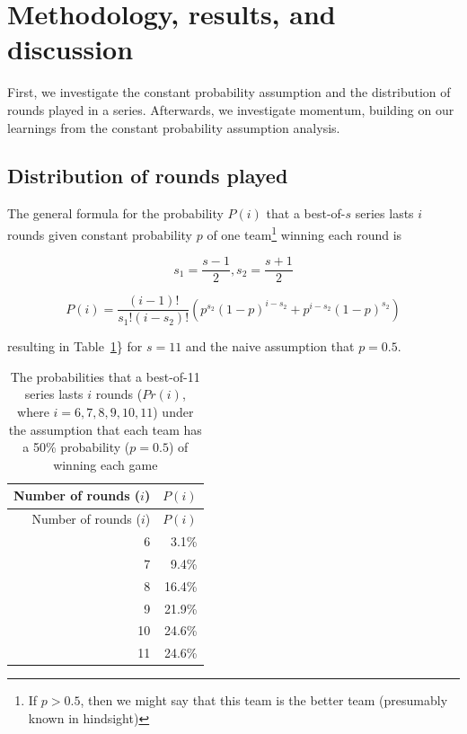\documentclass[
]{article}
\begin{document}
\hypertarget{methodology-results-and-discussion}{%
\section{Methodology, results, and
discussion}\label{methodology-results-and-discussion}}

First, we investigate the constant probability assumption and the
distribution of rounds played in a series. Afterwards, we investigate
momentum, building on our learnings from the constant probability
assumption analysis.

\hypertarget{distribution-of-rounds-played}{%
\subsection{Distribution of rounds
played}\label{distribution-of-rounds-played}}

The general formula for the probability \(P(i)\) that a best-of-\(s\)
series lasts \(i\) rounds given constant probability \(p\) of one
team\footnote{If \(p > 0.5\), then we might say that this team is the
  better team (presumably known in hindsight)} winning each round is

\[
s_1 = \frac{s - 1}{2}, s_2 = \frac{s + 1}{2}
\]

\[
P(i) = \frac{(i - 1)!}{s_1!(i - s_2)!}(p^{s_2}(1 - p)^{i - s_2} + p^{i - s_2}(1 - p)^{s_2})
\]

resulting in Table~\ref{tbl-prob-series-lasting-i-rounds}\} for
\(s = 11\) and the naive assumption that \(p = 0.5\).

\hypertarget{tbl-prob-series-lasting-i-rounds}{}
\begin{longtable}[]{@{}rr@{}}
\caption{\label{tbl-prob-series-lasting-i-rounds}The probabilities that
a best-of-11 series lasts \(i\) rounds (\(Pr(i)\), where
\(i = {6, 7, 8, 9, 10, 11}\)) under the assumption that each team has a
50\% probability (\(p = 0.5\)) of winning each game}\tabularnewline
\toprule()
Number of rounds (\(i\)) & \(P(i)\) \\
\midrule()
\endfirsthead
\toprule()
Number of rounds (\(i\)) & \(P(i)\) \\
\midrule()
\endhead
6 & 3.1\% \\
7 & 9.4\% \\
8 & 16.4\% \\
9 & 21.9\% \\
10 & 24.6\% \\
11 & 24.6\% \\
\bottomrule()
\end{longtable}
\end{document}

